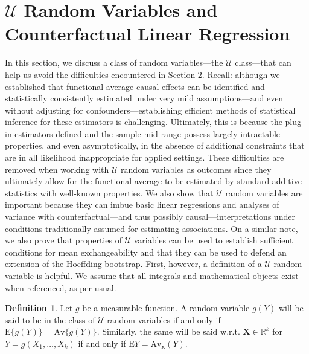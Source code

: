 \documentclass[12pt]{amsart}
\theoremstyle{plain}%
\theoremstyle{definition}
\newtheorem{definition}{Definition}
\theoremstyle{remark}
\numberwithin{equation}{section}
\begin{document}
\section{$\mathcal{U}$ Random Variables and Counterfactual Linear Regression}
In this section, we discuss a class of random variables---the $\mathcal{U}$ class---that can help us avoid the difficulties encountered in Section 2. Recall: although we established that functional average causal effects can be identified and statistically consistently estimated under very mild assumptions---and even without adjusting for confounders---establishing efficient methods of statistical inference for these estimators is challenging. Ultimately, this is because the plug-in estimators defined and the sample mid-range possess largely intractable properties, and even asymptotically, in the absence of additional constraints that are in all likelihood inappropriate for applied settings. These difficulties are removed when working with $\mathcal{U}$ random variables as outcomes since they ultimately allow for the functional average to be estimated by standard additive statistics with well-known properties. We also show that $\mathcal{U}$ random variables are important because they can imbue basic linear regressions and analyses of variance with counterfactual---and thus possibly causal---interpretations under conditions traditionally assumed for estimating associations. On a similar note, we also prove that properties of $\mathcal{U}$ variables can be used to establish sufficient conditions for mean exchangeability and that they can be used to defend an extension of the Hoeffding bootstrap. First, however, a definition of a $\mathcal{U}$ random variable is helpful. We assume that all integrals and mathematical objects exist when referenced, as per usual.
\begin{definition}
Let $g$ be a measurable function. A random variable $g(Y)$ will be said to be in the class of $\mathcal{U}$ random variables if and only if $\text{E} \{ g(Y) \} = \text{Av}\{ g(Y) \}$. Similarly, the same will be said w.r.t. $\mathbf{X} \in \mathbb{R}^k$ for $Y=g(X_1, \ldots, X_k)$ if and only if $\text{E}Y = \text{Av}_{\mathbf{x}}(Y)$.
\end{definition}
\end{document}
